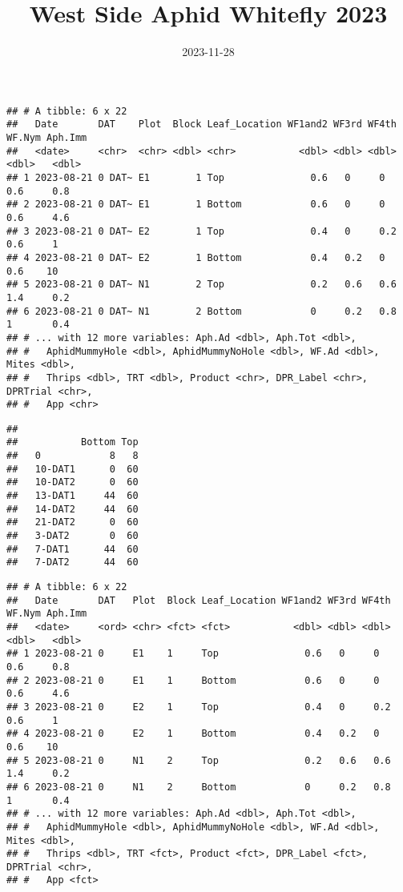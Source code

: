 \documentclass[
]{article}
\title{West Side Aphid Whitefly 2023}
\author{}
\date{\vspace{-2.5em}2023-11-28}
\begin{document}
\maketitle

\begin{verbatim}
## # A tibble: 6 x 22
##   Date       DAT    Plot  Block Leaf_Location WF1and2 WF3rd WF4th WF.Nym Aph.Imm
##   <date>     <chr>  <chr> <dbl> <chr>           <dbl> <dbl> <dbl>  <dbl>   <dbl>
## 1 2023-08-21 0 DAT~ E1        1 Top               0.6   0     0      0.6     0.8
## 2 2023-08-21 0 DAT~ E1        1 Bottom            0.6   0     0      0.6     4.6
## 3 2023-08-21 0 DAT~ E2        1 Top               0.4   0     0.2    0.6     1  
## 4 2023-08-21 0 DAT~ E2        1 Bottom            0.4   0.2   0      0.6    10  
## 5 2023-08-21 0 DAT~ N1        2 Top               0.2   0.6   0.6    1.4     0.2
## 6 2023-08-21 0 DAT~ N1        2 Bottom            0     0.2   0.8    1       0.4
## # ... with 12 more variables: Aph.Ad <dbl>, Aph.Tot <dbl>,
## #   AphidMummyHole <dbl>, AphidMummyNoHole <dbl>, WF.Ad <dbl>, Mites <dbl>,
## #   Thrips <dbl>, TRT <dbl>, Product <chr>, DPR_Label <chr>, DPRTrial <chr>,
## #   App <chr>
\end{verbatim}

\begin{verbatim}
##          
##           Bottom Top
##   0            8   8
##   10-DAT1      0  60
##   10-DAT2      0  60
##   13-DAT1     44  60
##   14-DAT2     44  60
##   21-DAT2      0  60
##   3-DAT2       0  60
##   7-DAT1      44  60
##   7-DAT2      44  60
\end{verbatim}

\begin{verbatim}
## # A tibble: 6 x 22
##   Date       DAT   Plot  Block Leaf_Location WF1and2 WF3rd WF4th WF.Nym Aph.Imm
##   <date>     <ord> <chr> <fct> <fct>           <dbl> <dbl> <dbl>  <dbl>   <dbl>
## 1 2023-08-21 0     E1    1     Top               0.6   0     0      0.6     0.8
## 2 2023-08-21 0     E1    1     Bottom            0.6   0     0      0.6     4.6
## 3 2023-08-21 0     E2    1     Top               0.4   0     0.2    0.6     1  
## 4 2023-08-21 0     E2    1     Bottom            0.4   0.2   0      0.6    10  
## 5 2023-08-21 0     N1    2     Top               0.2   0.6   0.6    1.4     0.2
## 6 2023-08-21 0     N1    2     Bottom            0     0.2   0.8    1       0.4
## # ... with 12 more variables: Aph.Ad <dbl>, Aph.Tot <dbl>,
## #   AphidMummyHole <dbl>, AphidMummyNoHole <dbl>, WF.Ad <dbl>, Mites <dbl>,
## #   Thrips <dbl>, TRT <fct>, Product <fct>, DPR_Label <fct>, DPRTrial <chr>,
## #   App <fct>
\end{verbatim}
\end{document}
